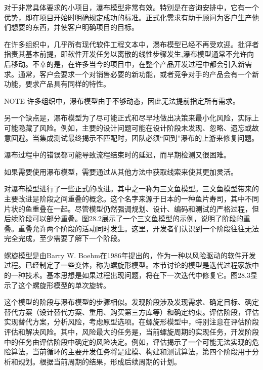 对于非常具体要求的小项目，瀑布模型非常有效。特别是在咨询安排中，它有一个优势，即在项目开始时明确规定成功的标准。正式化需求有助于顾问为客户生产他们想要的东西，并使客户明确项目的目标。


在许多组织中，几乎所有现代软件工程文本中，瀑布模型已经不再受欢迎。批评者指责其基本前提，即软件开发任务以离散的线性步骤发生,瀑布模型通常不允许向后移动。不幸的是，在许多当今的项目中，在整个产品开发过程中都会引入新需求。通常，客户会要求一个对销售必要的新功能，或者竞争对手的产品会有一个新功能，要求产品具有同样的特性。

\begin{myNotic}{NOTE}
许多组织中，瀑布模型由于不够动态，因此无法提前指定所有需求。
\end{myNotic}

另一个缺点是，瀑布模型为了尽可能正式和尽早地做出决策来最小化风险，实际上可能隐藏了风险。例如，主要的设计问题可能在设计阶段未发现、忽略、遗忘或故意回避。当集成测试最终揭示不匹配时，团队必须“回到”瀑布的上游来修复问题。

瀑布过程中的错误都可能导致流程结束时的延迟，而早期检测又很困难。

如果需要使用瀑布模型，需要通过从其他方法中获取线索来使其更加灵活。


对瀑布模型进行了一些正式的改进。其中之一称为三文鱼模型。三文鱼模型带来的主要改进是阶段之间重叠的概念。这个名字来源于日本的一种鱼片寿司，其中不同片状的鱼重叠在一起。尽管模型仍然强调规划、设计、编码和测试的严格过程，但后续阶段可以部分重叠。图28.2展示了一个三文鱼模型的示例，说明了阶段的重叠。重叠允许两个阶段的活动同时发生。这里，开发者们认识到一个阶段往往无法完全完成，至少需要了解下一个阶段。



螺旋模型是由Barry W. Boehm在1986年提出的，作为一种以风险驱动的软件开发过程。已经制定了一些变体，称为螺旋形模型。本节讨论的模型是迭代过程家族中的一种技术。基本思想是如果过程出现问题，将在下一次迭代中修复它。图28.3显示了这个螺旋形模型的单次旋转。

这个模型的阶段与瀑布模型的步骤相似。发现阶段涉及发现需求、确定目标、确定替代方案（设计替代方案、重用、购买第三方库等）和确定约束。评估阶段，评估实现替代方案，分析风险，考虑原型选项。在螺旋形模型中，特别注意在评估阶段评估和解决风险。其中，风险最大的任务是，当前螺旋周期的实现任务，开发阶段中的任务由评估阶段中确定的风险决定。例如，评估揭示了一个可能无法实现的危险算法，当前循环的主要开发任务将是建模、构建和测试算法，第四个阶段用于分析和规划。根据当前周期的结果，形成后续周期的计划。

